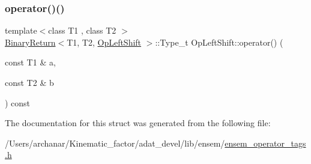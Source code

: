 \mbox{\label{structOpLeftShift_a1f91da026aec3d0ff36e700c21152b3c}} 
\subsubsection{\texorpdfstring{operator()()}{operator()()}\hspace{0.1cm}{\footnotesize\ttfamily [2/2]}}
{\footnotesize\ttfamily template$<$class T1 , class T2 $>$ \\
\mbox{\hyperlink{structBinaryReturn}{Binary\+Return}}$<$T1, T2, \mbox{\hyperlink{structOpLeftShift}{Op\+Left\+Shift}} $>$\+::Type\+\_\+t Op\+Left\+Shift\+::operator() (\begin{DoxyParamCaption}\item[{const T1 \&}]{a,  }\item[{const T2 \&}]{b }\end{DoxyParamCaption}) const\hspace{0.3cm}{\ttfamily [inline]}}



The documentation for this struct was generated from the following file\+:\begin{DoxyCompactItemize}
\item 
/\+Users/archanar/\+Kinematic\+\_\+factor/adat\+\_\+devel/lib/ensem/\mbox{\hyperlink{lib_2ensem_2ensem__operator__tags_8h}{ensem\+\_\+operator\+\_\+tags.\+h}}\end{DoxyCompactItemize}

